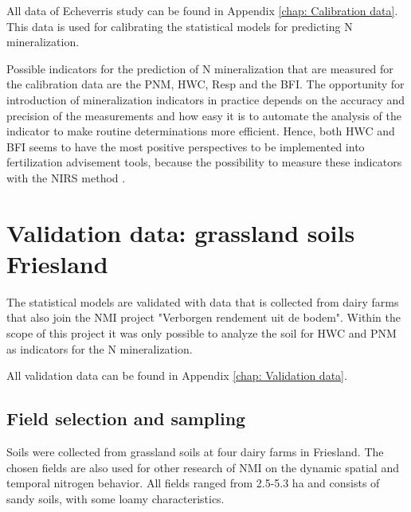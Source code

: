 \documentclass[10pt,twoside,dutch,english]{report}
\begin{document}
All data of Echeverris study can be found in Appendix \autoref{chap: Calibration data}. This data is used for calibrating the statistical models for predicting N mineralization.  

Possible indicators for the prediction of N mineralization that are measured for the calibration data are the PNM, HWC, Resp and the BFI. The opportunity for introduction of mineralization indicators in practice depends on the accuracy and precision of the measurements and how easy it is to automate the analysis of the indicator to make routine determinations more efficient. Hence, both HWC and BFI seems to have the most positive perspectives to be implemented into fertilization advisement tools, because the possibility to measure these indicators with the NIRS method \citep{Hanegraaf2008, Vasques2009}. 



\section{Validation data: grassland soils Friesland}
The statistical models are validated with data that is collected from dairy farms that also join the NMI project "Verborgen rendement uit de bodem". Within the scope of this project it was only possible to analyze the soil for HWC and PNM as indicators for the N mineralization. 

All validation data can be found in Appendix \autoref{chap: Validation data}.

\subsection{Field selection and sampling}
Soils were collected from grassland soils at four dairy farms in Friesland. The chosen fields are also used for other research of NMI on the dynamic spatial and temporal nitrogen behavior. All fields ranged from 2.5-5.3 ha and consists of sandy soils, with some loamy characteristics. %
\end{document}
